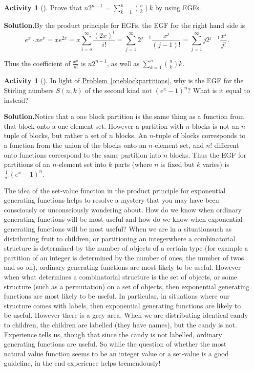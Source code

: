 \documentclass[10pt,]{book}
\theoremstyle{plain}
\theoremstyle{definition}
\newtheorem{activity}[project]{Activity}
\numberwithin{equation}{chapter}
\begin{document}
\begin{activity}[]\label{activity-367}
Prove that \(n2^{n-1} = \sum_{k=1}^n \binom{n}{k}k\) by using EGFs.%
\par\medskip\noindent%
\textbf{Solution.}\quad By the product principle for EGFs, the EGF for the right hand side is%
\begin{equation*}
e^x\cdot xe^x =xe^{2x}=x\sum_{i=o}^\infty \frac{(2x)^i}{i!} =
\sum_{j=1}^\infty 2^{j-1}\frac{x^j}{(j-1)!}=\sum_{j=1}^\infty
j2^{j-1}\frac{x^j}{j!}.
\end{equation*}
%
\par
Thus the coefficient of \(\frac{x^n}{n!}\) is \(n2^{n-1}\), as well as \(\sum_{k=1}^n \binom{n}{k}k\).%
\end{activity}
\begin{activity}[]\label{activity-368}
In light of \hyperref[oneblockpartitions]{Problem~\ref{oneblockpartitions}}, why is the EGF for the Stirling numbers \(S(n,k)\) of the second kind not \((e^x -1)^n\)? What is it equal to instead?%
\par\medskip\noindent%
\textbf{Solution.}\quad Notice that a one block partition is the same thing as a function from that block onto a one element set. However a partition with \(n\) blocks is not an \(n\)-tuple of blocks, but rather a set of \(n\) blocks. An \(n\)-tuple of blocks corresponds to a function from the union of the blocks onto an \(n\)-element set, and \(n!\) different onto functions correspond to the same partition into \(n\) blocks. Thus the EGF for partitions of an \(n\)-element set into \(k\) parts (where \(n\) is fixed but \(k\) varies) is \(\frac{1}{n!} (e^x -1)^n\).%
\end{activity}
The idea of the set-value function in the product principle for exponential generating functions helps to resolve a mystery that you may have been consciously or unconsciously wondering about. How do we know when ordinary generating functions will be most useful and how do we know when exponential generating functions will be most useful? When we are in a situation\textemdash{}such as distributing fruit to children, or partitioning an integer\textemdash{}where a combinatorial structure is determined by the number of objects of a certain type (for example a partition of an integer is determined by the number of ones, the number of twos and so on), ordinary generating functions are most likely to be useful. However when what determines a combinatorial structure is the set of objects, or some structure (such as a permutation) on a set of objects, then exponential generating functions are most likely to be useful. In particular, in situations where our structure comes with labels, then exponential generating functions are likely to be useful. However there is a grey area. When we are distributing identical candy to children, the children are labelled (they have names), but the candy is not. Experience tells us, though that since the candy is not labelled, ordinary generating functions are useful. So while the question of whether the most natural value function seems to be an integer value or a set-value is a good guideline, in the end experience helps tremendously!%
\typeout{************************************************}
\typeout{************************************************}
\end{document}
